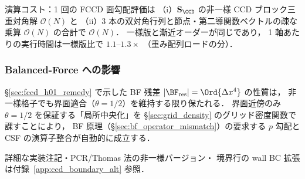 演算コスト：1 回の FCCD 面勾配評価は
（i）$\mathbf{S}_{\CCD}$ の非一様 CCD ブロック三重対角解 $\mathcal{O}(N)$ と
（ii）3 本の双対角行列と節点・第二導関数ベクトルの疎な乗算 $\mathcal{O}(N)$
の合計で $\mathcal{O}(N)$．
一様版と漸近オーダーが同じであり，
1 軸あたりの実行時間は一様版比で $1.1\text{--}1.3\times$
（重み配列ロードの分）．

\subsubsection{Balanced-Force への影響}
\label{sec:fccd_nu_bf_impact}

\S\ref{sec:fccd_h01_remedy} で示した BF 残差 $|\BF_\text{res}| = \Ord{\Delta x^4}$ の性質は，
非一様格子でも界面適合（$\theta=1/2$）を維持する限り保たれる．
界面近傍のみ $\theta=1/2$ を保証する「局所中央化」を
\S\ref{sec:grid_density} のグリッド密度関数で課すことにより，
BF 原理（\S\ref{sec:bf_operator_mismatch}）の要求する
$p$ 勾配と CSF の演算子整合が自動的に成立する．

\noindent 詳細な実装注記・PCR/Thomas 法の非一様バージョン・
境界行の wall BC 拡張は付録~\ref{app:ccd_boundary_alt} 参照．

